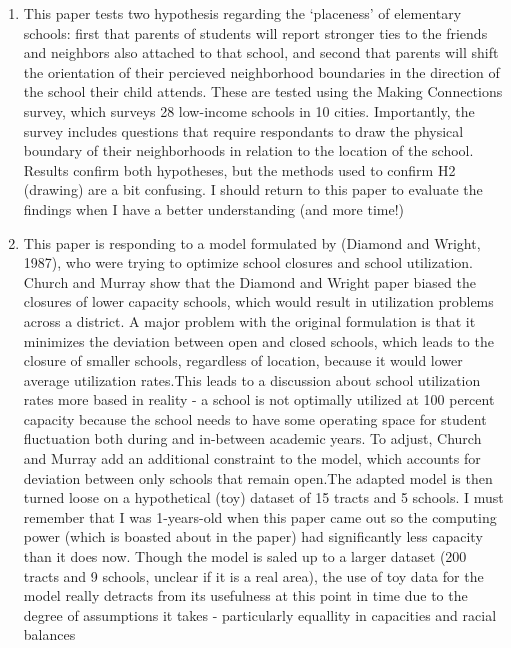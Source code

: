 \documentclass{article}
\begin{document}
\begin{enumerate}
\item \cite{burdick-will2018SchoolLocation} This paper tests two
  hypothesis regarding the `placeness' of elementary schools: first
  that parents of students will report stronger ties to the friends
  and neighbors also attached to that school, and second that parents
  will shift the orientation of their percieved neighborhood
  boundaries in the direction of the school their child attends. These
  are tested using the Making Connections survey, which surveys 28
  low-income schools in 10 cities. Importantly, the survey includes
  questions that require respondants to draw the physical boundary of
  their neighborhoods in relation to the location of the
  school. Results confirm both hypotheses, but the methods used to
  confirm H2 (drawing) are a bit confusing. I should return to this
  paper to evaluate the findings when I have a better understanding
  (and more time!)

  
\item \cite{church1993ModelingSchool} This paper is responding to a
  model formulated by (Diamond and Wright, 1987), who were trying to
  optimize school closures and school utilization. Church and Murray
  show that the Diamond and Wright paper biased the closures of lower
  capacity schools, which would result in utilization problems across
  a district. A major problem with the original formulation is that it
  minimizes the deviation between open and closed schools, which leads
  to the closure of smaller schools, regardless of location, because
  it would lower average utilization rates.This leads to a discussion
  about school utilization rates more based in reality - a school is
  not optimally utilized at 100 percent capacity because the school
  needs to have some operating space for student fluctuation both
  during and in-between academic years.  To adjust, Church and Murray
  add an additional constraint to the model, which accounts for
  deviation between only schools that remain open.The adapted model is
  then turned loose on a hypothetical (toy) dataset of 15 tracts and 5
  schools. I must remember that I was 1-years-old when this paper came
  out so the computing power (which is boasted about in the paper) had
  significantly less capacity than it does now. Though the model is
  saled up to a larger dataset (200 tracts and 9 schools, unclear if
  it is a real area), the use of toy data for the model really
  detracts from its usefulness at this point in time due to the degree
  of assumptions it takes - particularly equallity in capacities and
  racial balances


\end{enumerate}
\end{document}
